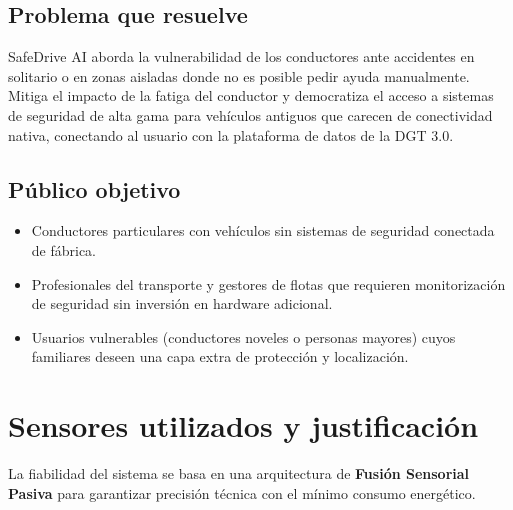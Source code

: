 \documentclass[11pt, a4paper]{article}
\begin{document}
    \subsection{Problema que resuelve}
    SafeDrive AI aborda la vulnerabilidad de los conductores ante accidentes en solitario o en zonas aisladas donde no es posible pedir ayuda manualmente. Mitiga el impacto de la fatiga del conductor y democratiza el acceso a sistemas de seguridad de alta gama para vehículos antiguos que carecen de conectividad nativa, conectando al usuario con la plataforma de datos de la DGT 3.0.

    \subsection{Público objetivo}
    \begin{itemize}
        \item Conductores particulares con vehículos sin sistemas de seguridad conectada de fábrica.
        \item Profesionales del transporte y gestores de flotas que requieren monitorización de seguridad sin inversión en hardware adicional.
        \item Usuarios vulnerables (conductores noveles o personas mayores) cuyos familiares deseen una capa extra de protección y localización.
    \end{itemize}

    \section{Sensores utilizados y justificación}
    La fiabilidad del sistema se basa en una arquitectura de \textbf{Fusión Sensorial Pasiva} para garantizar precisión técnica con el mínimo consumo energético.
\end{document}
